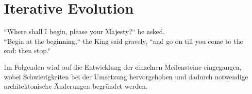 \chapter{Iterative Evolution}\label{sec:iterative_evolution}%


\vspace{5mm}
\begin{displayquote}
    ``Where shall I begin, please your Majesty{?}`` he asked.\\
    ``Begin at the beginning,`` the King said gravely, ``and go on
    till you come to the end: then stop.``
    \par\hfill\cite{Car65}
\end{displayquote}

\vspace{25mm}


Im Folgenden wird auf die Entwicklung der einzelnen Meilensteine eingegangen, wobei Schwierigkeiten bei der Umsetzung hervorgehoben und dadurch notwendige architektonische Änderungen begründet werden.









